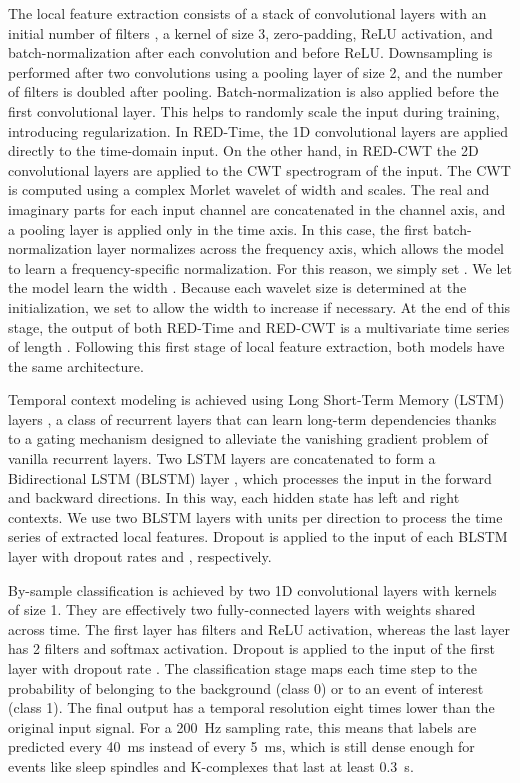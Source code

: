 \documentclass[conference]{IEEEtran}
\begin{document}
The local feature extraction consists of a stack of convolutional layers with an initial number of filters , a kernel of size 3, zero-padding, ReLU activation, and batch-normalization \cite{ioffe2015batch} after each convolution and before ReLU. Downsampling is performed after two convolutions using a pooling layer of size 2, and the number of filters is doubled after pooling. Batch-normalization is also applied before the first convolutional layer. This helps to randomly scale the input during training, introducing regularization. In RED-Time, the 1D convolutional layers are applied directly to the time-domain input. On the other hand, in RED-CWT the 2D convolutional layers are applied to the CWT spectrogram of the input. The CWT is computed using a complex Morlet wavelet of width  and  scales. The real and imaginary parts for each input channel are concatenated in the channel axis, and a pooling layer is applied only in the time axis. In this case, the first batch-normalization layer normalizes across the frequency axis, which allows the model to learn a frequency-specific normalization. For this reason, we simply set . We let the model learn the width . Because each wavelet size is determined at the initialization, we set  to allow the width to increase if necessary. At the end of this stage, the output of both RED-Time and RED-CWT is a multivariate time series of length . Following this first stage of local feature extraction, both models have the same architecture.

Temporal context modeling is achieved using Long Short-Term Memory (LSTM) layers \cite{hochreiter1997long}, a class of recurrent layers that can learn long-term dependencies thanks to a gating mechanism designed to alleviate the vanishing gradient problem of vanilla recurrent layers. Two LSTM layers are concatenated to form a Bidirectional LSTM (BLSTM) layer \cite{graves2005framewise}, which processes the input in the forward and backward directions. In this way, each hidden state has left and right contexts. We use two BLSTM layers with  units per direction to process the time series of extracted local features. Dropout \cite{srivastava2014dropout} is applied to the input of each BLSTM layer with dropout rates  and , respectively. 

By-sample classification is achieved by two 1D convolutional layers with kernels of size 1. They are effectively two fully-connected layers with weights shared across time. The first layer has  filters and ReLU activation, whereas the last layer has 2 filters and softmax activation. Dropout is applied to the input of the first layer with dropout rate . The classification stage maps each time step to the probability of belonging to the background (class 0) or to an event of interest (class 1). The final output has a temporal resolution eight times lower than the original input signal. For a 200~Hz sampling rate, this means that labels are predicted every 40~ms instead of every 5~ms, which is still dense enough for events like sleep spindles and K-complexes that last at least 0.3~s.
\end{document}
